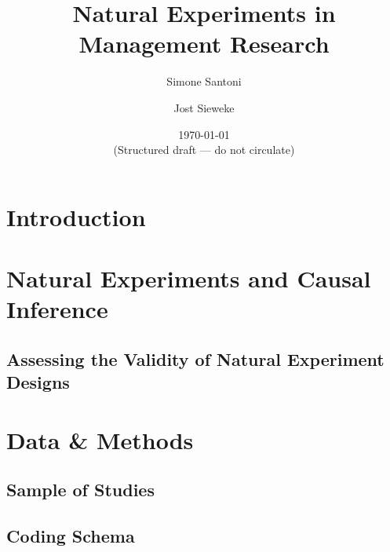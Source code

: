 \documentclass[nobib]{tufte-handout}
\title[Natural Experiments in Management Research]
{Natural Experiments in Management Research\vspace{2em}}
\author[$\bullet\circ$]{Simone Santoni}
\author[$\star$]{Jost Sieweke}
\affil[$\bullet$]{Bayes Business School (formerly Cass)}
\affil[$\circ$]{Soundcloud}
\affil[$\star$]{Vrije Universiteit Amsterdam}
\date{\vspace{1em} \normalsize \today \vspace{1em} \\ 
      \textcolor{RedOrange}{(Structured draft --- do not circulate)}}
\begin{document}
\maketitle

%
%
%

\clearpage

\begin{refsection}

\section{Introduction}
\label{introduction}



\section{Natural Experiments and Causal Inference}
\label{sec:standard_ne}



\subsection{Assessing the Validity of Natural Experiment Designs}
\label{sub:validity_framework}



\section{Data \& Methods}
\label{sec:article_selection}

\subsection{Sample of Studies}
\label{subsec:sample_of_studies}



\subsection{Coding Schema}
\label{sub:coding_schema}




\end{refsection}
\end{document}
